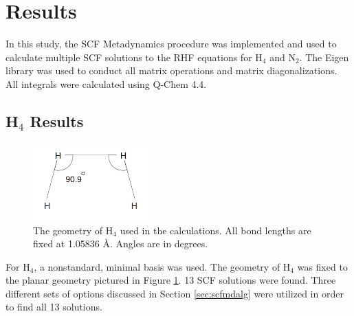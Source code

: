 \documentclass[final,3p,times,twocolumn]{elsarticle}
\begin{document}
\section{Results} \label{sec:results}

In this study, the SCF Metadynamics procedure was implemented and used to calculate multiple SCF solutions to the RHF equations for H$_4$ and N$_2$. The Eigen library\cite{eigen} was used to conduct all matrix operations and matrix diagonalizations. All integrals were calculated using Q-Chem 4.4.\cite{qchem}

\subsection{H$_4$ Results} \label{sec:h4results}

\begin{figure}
\centering
\includegraphics[width=0.4\textwidth]{h4_geo.png}
\caption{The geometry of H$_4$ used in the calculations. All bond lengths are fixed at 1.05836 \AA. Angles are in degrees.}
\label{fig:h4geo}
\end{figure}

For H$_4$, a nonstandard, minimal basis was used.\cite{h4basis} The geometry of H$_4$ was fixed to the planar geometry pictured in Figure \ref{fig:h4geo}. 13 SCF solutions were found. Three different sets of options discussed in Section \ref{sec:scfmdalg}  were utilized in order to find all 13 solutions.
\end{document}
